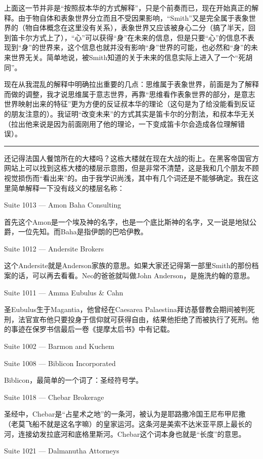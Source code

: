 \documentclass[UTF8]{ctexart}
\newcommand{\myparsep}{\noindent \rule[0.5ex]{\linewidth}{1pt}}
\begin{document}
上面这一节并非是“按照叔本华的方式解释”，只是个前奏而已，现在开始真正的解释。由于物自体和表象世界分立而且不受因果影响，“Smith”又是完全属于表象世界的（物自体概念在这里没有关系），表象世界又应该被身心二分（搞了半天，回到笛卡尔方式上了），“心”可以获得“身”在未来的信息，但是只要“心”的信息不表现到“身”的世界来，这个信息也就并没有影响“身”世界的可能，也必然和“身”的未来世界无关。简单地说，被Smith知道的关于未来的信息实际上进入了一个“死胡同”。

现在从我混乱的解释中明确拉出重要的几点：思维属于表象世界，前面是为了解释而做的调整，我才说思维属于意志世界，再靠“思维看作表象世界的部分，是意志世界映射出来的特征”更为方便的反证叔本华的理论（这句是为了给没能看到反证的朋友注意的）。我证明“改变未来”的方式其实是笛卡尔的分割法，和叔本华无关（拉出他来说是因为前面刚用了他的理论，一下变成笛卡尔会造成各位理解错误）。

\myparsep

还记得法国人餐馆所在的大楼吗？这栋大楼就在现在大战的街上。在黑客帝国官方网站上可以找到这栋大楼的楼层示意图，但是非常不清楚，这是我和几个朋友不顾视觉损伤而“看出来”的。由于我学识尚浅，其中有几个词还是不能够确定。我在这里简单解释一下没有歧义的楼层名称：

Suite 1013 --- Amon Baha Consulting

首先这个Amon是一个埃及神的名字，也是一个底比斯神的名字，又一说是地狱公爵，一位先知。而Baha是指伊朗的巴哈伊教。

Suite 1012 --- Andersite Brokers

这个Andersite就是Anderson家族的意思。如果大家还记得第一部里Smith的那份档案的话，可以再去看看。Neo的爸爸就叫做John Anderson，是施洗约翰的意思。

Suite 1011 --- Amma Eubulus \& Cahn

圣Eubulus生于Magantia，他曾经在Caesarea Palaestina拜访基督教会期间被判死刑，法官宣布他只要投身于信仰就可获得自由，结果他拒绝了而被执行了死刑。他的事迹在保罗书信最后一卷《提摩太后书》中有记载。

Suite 1002 --- Barmon and Kuchem

Suite 1008 --- Biblicon Incorporated

Biblicon，最简单的一个词了：圣经符号学。

Suite 1018 --- Chebar Brokerage

圣经中，Chebar是“占星术之地”的一条河，被认为是耶路撒冷国王尼布甲尼撒（老莫飞船不就是这名字嘛）的皇家运河。这条河是美索不达米亚平原上最长的河，连接幼发拉底河和底格里斯河。Chebar这个词本身也就是“长度”的意思。

Suite 1021 --- Dalmanutha Attorneys
\end{document}

